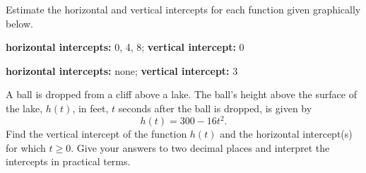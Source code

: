 \begin{exercise}
Estimate the horizontal and vertical intercepts for each function given graphically below.


\begin{parts}

\item {}





\item 

\end{parts}

\end{exercise}



\begin{solution}
    \begin{parts}
        \item {\bf horizontal intercepts:} 0, 4, 8; {\bf vertical intercept:} 0
        \item {\bf horizontal intercepts:} none; {\bf vertical intercept:} 3
    \end{parts}
\end{solution}







\begin{exercise}
A ball is dropped from a cliff above a lake. The ball's height above the surface of the lake, $h(t)$, in feet, $t$ seconds after the ball is dropped, is given by
\[h(t)=300-16t^2.\]
Find the vertical intercept of the function $h(t)$ and the horizontal intercept(s) for which $t\geq 0$. Give your answers to two decimal places and interpret the intercepts in practical terms.

\end{exercise}



